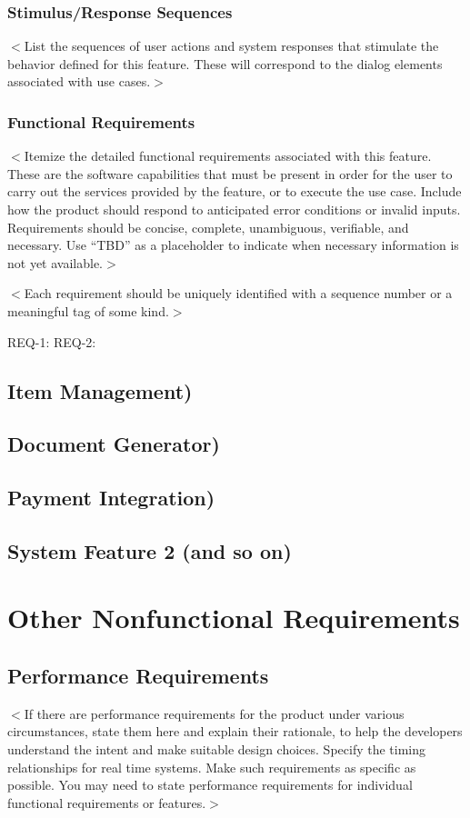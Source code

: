 \documentclass{scrreprt}
\begin{document}
\subsection{Stimulus/Response Sequences}
$<$List the sequences of user actions and system responses that stimulate the 
behavior defined for this feature. These will correspond to the dialog elements 
associated with use cases.$>$

\subsection{Functional Requirements}
$<$Itemize the detailed functional requirements associated with this feature.  
These are the software capabilities that must be present in order for the user 
to carry out the services provided by the feature, or to execute the use case.  
Include how the product should respond to anticipated error conditions or 
invalid inputs. Requirements should be concise, complete, unambiguous, 
verifiable, and necessary. Use “TBD” as a placeholder to indicate when necessary 
information is not yet available.$>$

$<$Each requirement should be uniquely identified with a sequence number or a 
meaningful tag of some kind.$>$

REQ-1:	REQ-2:

\section{Item Management)}

\section{Document Generator)}

\section{Payment Integration)}

\section{System Feature 2 (and so on)}


\chapter{Other Nonfunctional Requirements}

\section{Performance Requirements}
$<$If there are performance requirements for the product under various 
circumstances, state them here and explain their rationale, to help the 
developers understand the intent and make suitable design choices. Specify the 
timing relationships for real time systems. Make such requirements as specific 
as possible. You may need to state performance requirements for individual 
functional requirements or features.$>$
\end{document}
